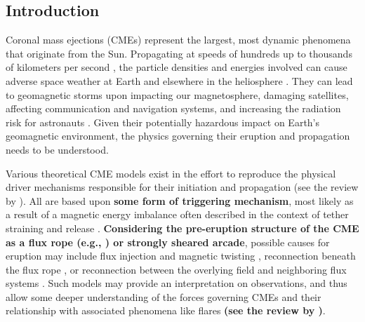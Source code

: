 \documentclass[namedreferences]{solarphysics}
\begin{document}
\begin{article}
\section{Introduction}
\label{intro}

Coronal mass ejections (CMEs) represent the largest, most dynamic phenomena that originate from the Sun. Propagating at speeds of hundreds up to thousands of kilometers per second \cite{2004JGRA..10907105Y}, the particle densities and energies involved can cause adverse space weather at Earth and elsewhere in the heliosphere \cite{2005AnGeo..23.1033S}. They can lead to geomagnetic storms upon impacting our magnetosphere, damaging satellites, affecting communication and navigation systems, and increasing the radiation risk for astronauts \cite{2007A&G....48f..11L}. Given their potentially hazardous impact on Earth's geomagnetic environment, the physics governing their eruption and propagation needs to be understood. 

Various theoretical CME models exist in the effort to reproduce the physical driver mechanisms responsible for their initiation and propagation (see the review by ). All are based upon {\bf some form of triggering mechanism}, most likely as a result of a magnetic energy imbalance often described in the context of tether straining and release \cite{2001AGUGM.125..143K}. {\bf Considering the pre-eruption structure of the CME as a flux rope (e.g., ) or strongly sheared arcade}, possible causes for eruption may include flux injection and magnetic twisting \cite{2006PhRvL..96y5002K,2001ApJ...562.1045K}, reconnection beneath the flux rope \cite{2007ApJ...658L.123L,2003ApJ...595.1231A,1995ApJ...446..377F,1980IAUS...91..207M}, or reconnection between the overlying field and neighboring flux systems \cite{2008ApJ...683.1192L,2007ApJ...671L..77V,1999ApJ...510..485A}. Such models may provide an interpretation on observations, and thus allow some deeper understanding of the forces governing CMEs and their relationship with associated phenomena like flares {\bf (see the review by )}.


\end{article}
\end{document}
